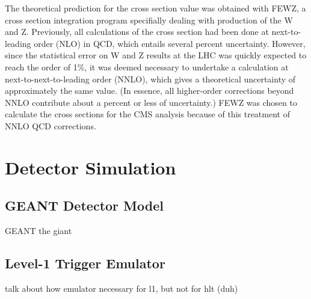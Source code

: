 





The theoretical prediction for the cross section value 
was obtained with FEWZ, 
a cross section integration program 
specifially dealing with production of the W and Z.  
Previously, all calculations of the cross section 
had been done at next-to-leading order (NLO) in QCD, 
which entails several percent uncertainty.  
However, since the statistical error on 
W and Z results at the LHC 
was quickly expected to reach the order of 1\%, 
it was deemed necessary to undertake 
a calculation at next-to-next-to-leading order (NNLO), 
which gives a theoretical uncertainty of 
approximately the same value.  
(In essence, all higher-order corrections beyond NNLO 
contribute about a percent or less of uncertainty.)  
FEWZ was chosen to calculate the cross sections 
for the CMS analysis 
because of this treatment of NNLO QCD corrections.  


\section{Detector Simulation}
\label{sim:Detector}

\subsection{GEANT Detector Model}
\label{sim:DetectorGeant}

GEANT the giant

\subsection{Level-1 Trigger Emulator}
\label{sim:DetectorL1Emul}
talk about how emulator necessary for l1, but not for hlt (duh)
